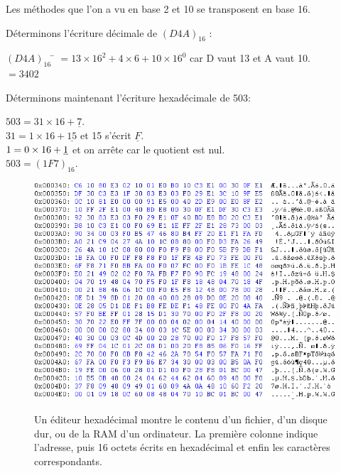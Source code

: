 Les méthodes que l'on a vu en base 2 et 10 se transposent en base 16.
\begin{methode}
    Déterminons l'écriture décimale de $(D4A)_{16}$ :
    \begin{tabbing}
        $(D4A)_{16}$  	\= $=13\times 16^2 + 4\times 6 + 10\times 16^0$	 car D vaut 13 et A vaut 10.\\
        \>	$=3402$
    \end{tabbing}
\end{methode}
\begin{methode}
    Déterminons maintenant l'écriture hexadécimale de 503:

    $503 = 31 \times 16 + \underline{7}$.\\

    $31 = 1\times 16 + \underline{15}$ et 15 s'écrit $\underline{F}$.\\

    $1 = {\boldmath 0}\times 16 + \underline{1}$ et on arrête car le quotient est nul.\\

    $503=(1F7)_{16}$.\\

\end{methode}
\begin{figure}[H]
    \begin{center}
        \includegraphics[width=12cm]{ch-bases/img/hex.png}\\
        \caption*{Un éditeur hexadécimal montre le contenu d'un fichier, d'un disque dur, ou de la RAM d'un ordinateur. La première colonne indique l'adresse,
            puis 16 octets écrits en hexadécimal et enfin les caractères correspondants.}
    \end{center}
\end{figure}
